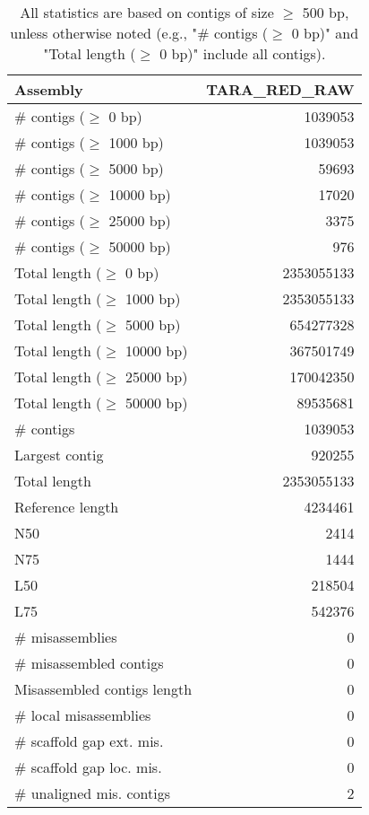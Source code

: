 \documentclass[12pt,a4paper]{article}
\begin{document}
\begin{table}[ht]
\begin{center}
\caption{All statistics are based on contigs of size $\geq$ 500 bp, unless otherwise noted (e.g., "\# contigs ($\geq$ 0 bp)" and "Total length ($\geq$ 0 bp)" include all contigs).}
\begin{tabular}{|l*{1}{|r}|}
\hline
Assembly & TARA\_RED\_RAW \\ \hline
\# contigs ($\geq$ 0 bp) & 1039053 \\ \hline
\# contigs ($\geq$ 1000 bp) & 1039053 \\ \hline
\# contigs ($\geq$ 5000 bp) & 59693 \\ \hline
\# contigs ($\geq$ 10000 bp) & 17020 \\ \hline
\# contigs ($\geq$ 25000 bp) & 3375 \\ \hline
\# contigs ($\geq$ 50000 bp) & 976 \\ \hline
Total length ($\geq$ 0 bp) & 2353055133 \\ \hline
Total length ($\geq$ 1000 bp) & 2353055133 \\ \hline
Total length ($\geq$ 5000 bp) & 654277328 \\ \hline
Total length ($\geq$ 10000 bp) & 367501749 \\ \hline
Total length ($\geq$ 25000 bp) & 170042350 \\ \hline
Total length ($\geq$ 50000 bp) & 89535681 \\ \hline
\# contigs & 1039053 \\ \hline
Largest contig & 920255 \\ \hline
Total length & 2353055133 \\ \hline
Reference length & 4234461 \\ \hline
N50 & 2414 \\ \hline
N75 & 1444 \\ \hline
L50 & 218504 \\ \hline
L75 & 542376 \\ \hline
\# misassemblies & 0 \\ \hline
\# misassembled contigs & 0 \\ \hline
Misassembled contigs length & 0 \\ \hline
\# local misassemblies & 0 \\ \hline
\# scaffold gap ext. mis. & 0 \\ \hline
\# scaffold gap loc. mis. & 0 \\ \hline
\# unaligned mis. contigs & 2 \\ \hline

\end{tabular}
\end{center}
\end{table}
\end{document}
